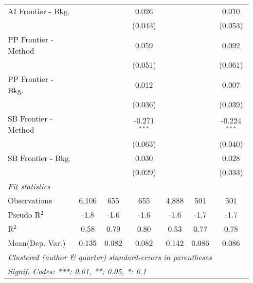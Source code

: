 \begin{tabular}{lcccccc}
   AI Frontier - Bkg.   &               &             & 0.026          &              &             & 0.010\\   
                        &               &             & (0.043)        &              &             & (0.053)\\   
   PP Frontier - Method &               &             & 0.059          &              &             & 0.092\\   
                        &               &             & (0.051)        &              &             & (0.061)\\   
   PP Frontier - Bkg.   &               &             & 0.012          &              &             & 0.007\\   
                        &               &             & (0.036)        &              &             & (0.039)\\   
   SB Frontier - Method &               &             & -0.271$^{***}$ &              &             & -0.224$^{***}$\\   
                        &               &             & (0.063)        &              &             & (0.040)\\   
   SB Frontier - Bkg.   &               &             & 0.030          &              &             & 0.028\\   
                        &               &             & (0.029)        &              &             & (0.033)\\   
   \midrule
   \emph{Fit statistics}\\
   Observations         & 6,106         & 655         & 655            & 4,888        & 501         & 501\\  
   Pseudo R$^2$         & -1.8          & -1.6        & -1.6           & -1.6         & -1.7        & -1.7\\  
   R$^2$                & 0.58          & 0.79        & 0.80           & 0.53         & 0.77        & 0.78\\  
Mean(Dep. Var.) & 0.135 & 0.082 & 0.082 & 0.142 & 0.086 & 0.086 \\
   \midrule \midrule
   \multicolumn{7}{l}{\emph{Clustered (author \& quarter) standard-errors in parentheses}}\\
   \multicolumn{7}{l}{\emph{Signif. Codes: ***: 0.01, **: 0.05, *: 0.1}}\\
\end{tabular}
\par\endgroup
